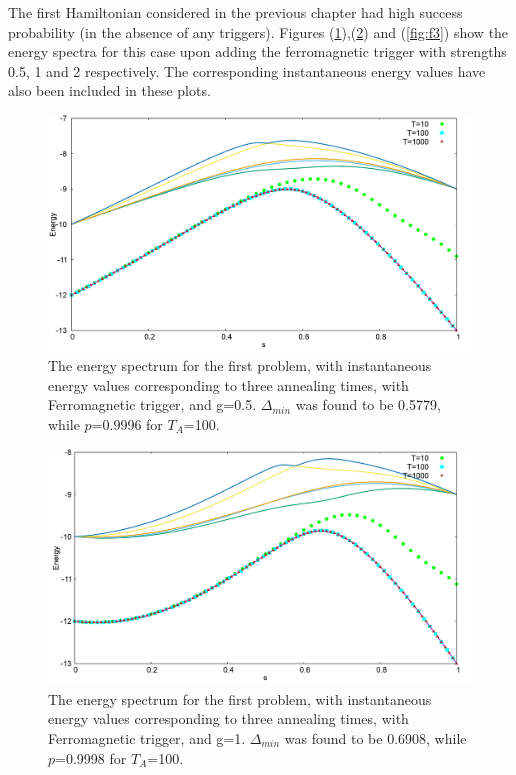 \documentclass[../main.tex]{subfiles}
\begin{document}
The first Hamiltonian considered in the previous chapter had high success probability (in the absence of any triggers). Figures (\ref{fig:f1}),(\ref{fig:f2}) and (\ref{fig:f3}) show the energy spectra for this case upon adding the ferromagnetic trigger with strengths 0.5, 1 and 2 respectively. The corresponding instantaneous energy values have also been included in these plots. 
\begin{figure}[H]
\centering 
\includegraphics[scale=0.3]{733_s12_F_g0.png}
\caption{The energy spectrum for the first problem, with instantaneous energy values corresponding to three annealing times, with Ferromagnetic trigger, and g=0.5. $\Delta_{min}$ was found to be 0.5779, while $p$=0.9996 for $T_A$=100. }
\label{fig:f1}
\end{figure}
\begin{figure}[H]
\centering 
\includegraphics[scale=0.3]{733_s12_F_g1.png}
\caption{The energy spectrum for the first problem, with instantaneous energy values corresponding to three annealing times, with Ferromagnetic trigger, and g=1. $\Delta_{min}$ was found to be 0.6908, while $p$=0.9998 for $T_A$=100.}
\label{fig:f2}
\end{figure}
\end{document}
